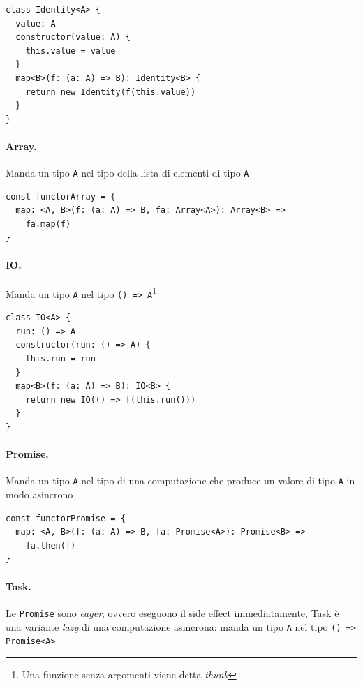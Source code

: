 \documentclass[12pt]{article}
\begin{document}
\begin{verbatim}
class Identity<A> {
  value: A
  constructor(value: A) {
    this.value = value
  }
  map<B>(f: (a: A) => B): Identity<B> {
    return new Identity(f(this.value))
  }
}
\end{verbatim}

\paragraph{Array.}

Manda un tipo \texttt{A} nel tipo della lista di elementi di tipo \texttt{A}

\begin{verbatim}
const functorArray = {
  map: <A, B>(f: (a: A) => B, fa: Array<A>): Array<B> =>
    fa.map(f)
}
\end{verbatim}

\paragraph{IO.}

Manda un tipo \texttt{A} nel tipo \texttt{() => A}\footnote{Una funzione senza argomenti viene detta \emph{thunk}}

\begin{verbatim}
class IO<A> {
  run: () => A
  constructor(run: () => A) {
    this.run = run
  }
  map<B>(f: (a: A) => B): IO<B> {
    return new IO(() => f(this.run()))
  }
}
\end{verbatim}

\paragraph{Promise.}

Manda un tipo \texttt{A} nel tipo di una computazione che produce un valore di tipo \texttt{A} in modo asincrono

\begin{verbatim}
const functorPromise = {
  map: <A, B>(f: (a: A) => B, fa: Promise<A>): Promise<B> =>
    fa.then(f)
}
\end{verbatim}

\paragraph{Task.}

Le \texttt{Promise} sono \emph{eager}, ovvero eseguono il side effect immediatamente, Task è una variante \emph{lazy}
di una computazione asincrona: manda un tipo \texttt{A} nel tipo \texttt{() => Promise<A>}
\end{document}
